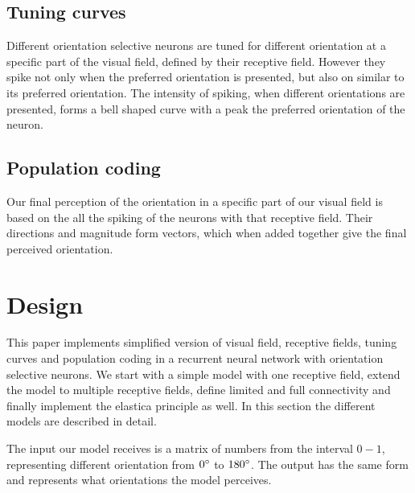 \section{Tuning curves}

Different orientation selective neurons are tuned for different orientation at a specific part of the visual field, defined by their receptive field. However they spike not only when the preferred orientation is presented, but also on similar to its preferred orientation. The intensity of spiking, when different orientations are presented, forms a bell shaped curve with a peak the preferred orientation of the neuron. 



\section{Population coding}

Our final perception of the orientation in a specific part of our visual field is based on the all the spiking of the neurons with that receptive field. Their directions and magnitude form vectors, which when added together give the final perceived orientation.


\chapter{Design}

This paper implements simplified version of visual field, receptive fields, tuning curves and population coding in a recurrent neural network with orientation selective neurons. We start with a simple model with one receptive field, extend the model to multiple receptive fields, define limited and full connectivity and finally implement the elastica principle as well. In this section the different models are described in detail.

The input our model receives is a matrix of numbers from the interval $0-1$, representing different orientation from $0\degree$ to $180\degree$. The output has the same form and represents what orientations the model perceives.




